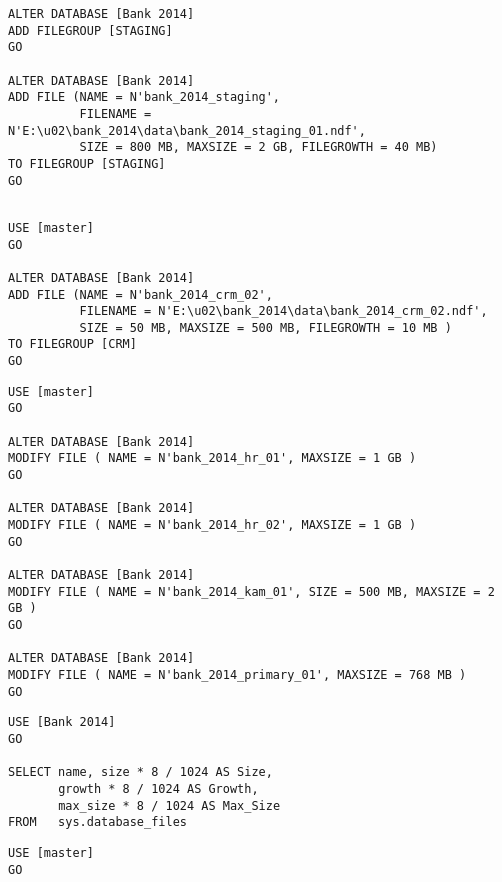 \begin{enumerate}
\begin{lstlisting}[language=ms_sql, caption={Hinzufügen einer
        Dateigruppe mit Datendatei}, label=admin_03_loesung_08]
ALTER DATABASE [Bank 2014] 
ADD FILEGROUP [STAGING]
GO

ALTER DATABASE [Bank 2014] 
ADD FILE (NAME = N'bank_2014_staging', 
          FILENAME = N'E:\u02\bank_2014\data\bank_2014_staging_01.ndf', 
          SIZE = 800 MB, MAXSIZE = 2 GB, FILEGROWTH = 40 MB) 
TO FILEGROUP [STAGING]
GO
        
        \end{lstlisting}
\clearpage        
        
        \begin{lstlisting}[language=ms_sql, caption={Hinzufügen einer
        Datendatei zu einer bestehenden Dateigruppe}, label=admin_03_loesung_09]
USE [master]
GO

ALTER DATABASE [Bank 2014] 
ADD FILE (NAME = N'bank_2014_crm_02', 
          FILENAME = N'E:\u02\bank_2014\data\bank_2014_crm_02.ndf', 
          SIZE = 50 MB, MAXSIZE = 500 MB, FILEGROWTH = 10 MB )
TO FILEGROUP [CRM]
GO        
        \end{lstlisting}
        
      
      \begin{lstlisting}[language=ms_sql, caption={Ändern der
      Datendateieigenschaften}, label=admin_03_loesung_10]
USE [master]
GO

ALTER DATABASE [Bank 2014] 
MODIFY FILE ( NAME = N'bank_2014_hr_01', MAXSIZE = 1 GB )
GO

ALTER DATABASE [Bank 2014] 
MODIFY FILE ( NAME = N'bank_2014_hr_02', MAXSIZE = 1 GB )
GO

ALTER DATABASE [Bank 2014] 
MODIFY FILE ( NAME = N'bank_2014_kam_01', SIZE = 500 MB, MAXSIZE = 2 GB )
GO

ALTER DATABASE [Bank 2014]
MODIFY FILE ( NAME = N'bank_2014_primary_01', MAXSIZE = 768 MB )
GO
      \end{lstlisting}
\clearpage
      
      \begin{lstlisting}[language=ms_sql, caption={Abfragen der
      Datendateieigenschaften}, label=admin_03_loesung_11]
USE [Bank 2014]
GO

SELECT name, size * 8 / 1024 AS Size, 
       growth * 8 / 1024 AS Growth, 
       max_size * 8 / 1024 AS Max_Size
FROM   sys.database_files
      \end{lstlisting}
      
      
      \begin{lstlisting}[language=ms_sql, caption={Verschieben einer
      Datendatei}, label=admin_03_loesung_12]
USE [master]
GO


\end{lstlisting}
\end{enumerate}
